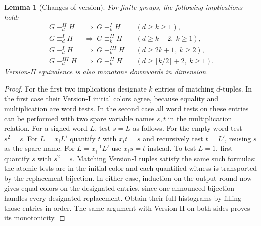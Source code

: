 \documentclass[11pt]{article}
\newtheorem{lemma}[theorem]{Lemma}
\theoremstyle{definition}
\theoremstyle{remark}
\numberwithin{equation}{section}
\begin{document}
\begin{lemma}[Changes of version]\label{lem:version-comparisons}
For finite groups, the following implications hold:
\begin{align*}
 G\equiv^{II}_d H&\ \Longrightarrow\ G\equiv^{I}_k H
     &&(d\ge k\ge1),\\
 G\equiv^{I}_d H&\ \Longrightarrow\ G\equiv^{II}_k H
     &&(d\ge k+2,\ k\ge1),\\
 G\equiv^{I}_d H&\ \Longrightarrow\ G\equiv^{III}_k H
     &&(d\ge2k+1,\ k\ge2),\\
 G\equiv^{III}_d H&\ \Longrightarrow\ G\equiv^{II}_k H
     &&(d\ge\lceil k/2\rceil+2,\ k\ge1).
\end{align*}
Version-II equivalence is also monotone downwards in dimension.
\end{lemma}
\begin{proof}
For the first two implications designate $k$ entries of matching
$d$-tuples. In the first case their Version-I initial colors agree,
because equality and multiplication are word tests. In the second
case all word tests on these entries can be performed with two spare
variable names $s,t$ in the multiplication relation. For a signed word
$L$, test $s=L$ as follows. For the empty word test $s^2=s$. For
$L=x_iL'$ quantify $t$ with $x_it=s$ and recursively test $t=L'$,
reusing $s$ as the spare name. For $L=x_i^{-1}L'$ use $x_is=t$
instead. To test $L=1$, first quantify $s$ with $s^2=s$. Matching
Version-I tuples satisfy the same such formulas: the atomic tests are
in the initial color and each quantified witness is transported by the
replacement bijection. In either case, induction on the output round
now gives equal colors on the designated entries, since one announced
bijection handles every designated replacement. Obtain their full
histograms by filling those entries in order. The same argument with
Version II on both sides proves its monotonicity.


\end{proof}
\end{document}

